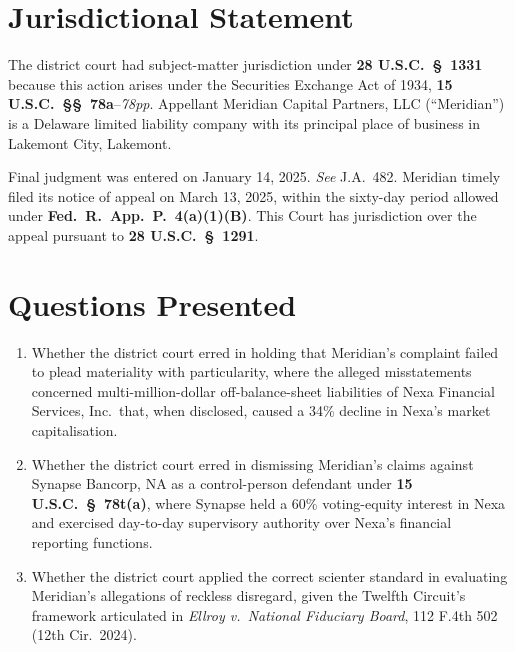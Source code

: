 \documentclass[12pt]{article}
\newcommand{\courtcase}[1]{\textit{#1}}
\newcommand{\statute}[1]{\textbf{#1}}
\begin{document}

\section{Jurisdictional Statement}

The district court had subject-matter jurisdiction under \statute{28 U.S.C.\ \S\ 1331}
because this action arises under the Securities Exchange Act of 1934, \statute{15 U.S.C.\
\S\S\ 78a}--\textit{78pp}. Appellant Meridian Capital Partners, LLC (``Meridian'') is a
Delaware limited liability company with its principal place of business in Lakemont City,
Lakemont.

Final judgment was entered on January 14, 2025. \textit{See} J.A.\ 482. Meridian timely
filed its notice of appeal on March 13, 2025, within the sixty-day period allowed
under \statute{Fed.\ R.\ App.\ P.\ 4(a)(1)(B)}. This Court has jurisdiction over the
appeal pursuant to \statute{28 U.S.C.\ \S\ 1291}.


\section{Questions Presented}

\begin{enumerate}[label=\Roman{enumi}.,leftmargin=*,itemsep=8pt]

  \item Whether the district court erred in holding that Meridian's complaint failed to
  plead materiality with particularity, where the alleged misstatements concerned
  multi-million-dollar off-balance-sheet liabilities of Nexa Financial Services, Inc.\
  that, when disclosed, caused a 34\% decline in Nexa's market capitalisation.

  \item Whether the district court erred in dismissing Meridian's claims against
  Synapse Bancorp, NA as a control-person defendant under \statute{15 U.S.C.\ \S\
  78t(a)}, where Synapse held a 60\% voting-equity interest in Nexa and exercised day-to-day
  supervisory authority over Nexa's financial reporting functions.

  \item Whether the district court applied the correct scienter standard in evaluating
  Meridian's allegations of reckless disregard, given the Twelfth Circuit's framework
  articulated in \courtcase{Ellroy v.\ National Fiduciary Board}, 112 F.4th 502 (12th
  Cir.\ 2024).

\end{enumerate}
\end{document}
